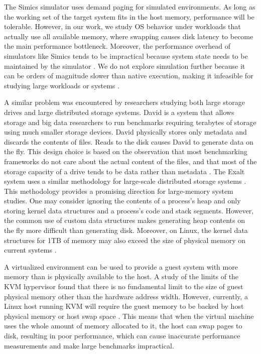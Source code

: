 \documentclass[twocolumn,11pt]{article}
\begin{document}

The Simics simulator uses demand paging for simulated environments.
As long as the working set of
the target system fits in the host memory, performance will be tolerable.
However, in our work, we study OS behavior under workloads that
actually use all available memory, where swapping causes disk latency to become the main
performance bottleneck. Moreover, the performance overhead of simulators like
Simics tends to be impractical because system state needs to be maintained by
the simulator \cite{simics}. We do not explore simulation further because it
can be orders of magnitude slower than native execution, making it infeasible
for studying large workloads or systems \cite{2kmachine}.

A similar problem was encountered by researchers studying both large storage
drives and large distributed storage systems. David is a system that allows
storage and big data researchers to run benchmarks requiring terabytes of
storage using much smaller storage devices.
David physically stores only
metadata and discards the contents of files. Reads to the disk causes David to
generate data on the fly. This design choice is based on the observation that
most benchmarking frameworks do not care about the actual content of the files,
and that most of the storage capacity of a drive tends to be data rather than
metadata \cite{david}. The Exalt system uses a similar methodology for
large-scale distributed storage systems \cite{exalt}. This methodology provides
a promising direction for large-memory system studies. One may consider ignoring
the contents of a process’s heap and only storing kernel data structures and a
process’s code and stack segments. However, the common use of custom data
structures makes generating heap contents on the fly
more difficult than generating disk. Moreover, on Linux, the kernel data structures for 1TB
of memory may also exceed the size of physical memory on current systems
\cite{simics}.

A virtualized environment can be used to provide a guest system with more memory
than is physically available to the host. A study of the limits of the KVM
hypervisor found that there is no fundamental limit to the size of guest
physical memory other than the hardware address width. However, currently, a
Linux host running KVM will require the guest memory to be backed by host
physical memory or host swap space \cite{ibmkvm}.  This means that when the
virtual machine uses the whole amount of memory allocated to it, the host can
swap pages to disk, resulting in poor performance, which can cause inaccurate
performance measurements and make large
benchmarks impractical.
\end{document}
